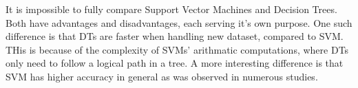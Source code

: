 \hspace{0.5cm} It is impossible to fully compare Support Vector Machines and Decision Trees. Both have advantages and disadvantages, each serving it's own purpose. One such difference is that DTs are faster when handling new dataset, compared to SVM. THis is because of the complexity of SVMs' arithmatic computations, where DTs only need to follow a logical path in a tree. A more interesting difference is that SVM has higher accuracy in general as was observed in numerous studies\cite{arun2010hybrid}. 